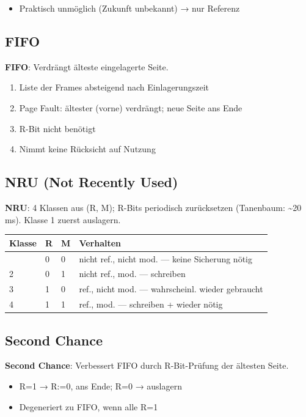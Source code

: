 \documentclass[11pt, a4paper]{article}
\begin{document}
\begin{itemize}
  \item Praktisch unmöglich (Zukunft unbekannt) → nur Referenz
\end{itemize}


\subsection{FIFO}
\textbf{FIFO}: Verdrängt älteste eingelagerte Seite.

\begin{enumerate}
  \item Liste der Frames absteigend nach Einlagerungszeit
  \item Page Fault: ältester (vorne) verdrängt; neue Seite ans Ende
  \item R-Bit nicht benötigt
  \item Nimmt keine Rücksicht auf Nutzung
\end{enumerate}


\subsection{NRU (Not Recently Used)}
\textbf{NRU}: 4 Klassen aus (R, M); R-Bits periodisch zurücksetzen (Tanenbaum: \textasciitilde{}20 ms). Klasse 1 zuerst auslagern.



{\small
\begin{tabularx}{\linewidth}{XXXX}
\hline
\rowcolor{tableheadbg}
{\color{white}\textbf{Klasse}} & {\color{white}\textbf{R}} & {\color{white}\textbf{M}} & {\color{white}\textbf{Verhalten}} \\[2pt]
\hline
\endhead
\hline
\endfoot
1 & 0 & 0 & nicht ref., nicht mod. — keine Sicherung nötig \\
2 & 0 & 1 & nicht ref., mod. — schreiben \\
3 & 1 & 0 & ref., nicht mod. — wahrscheinl. wieder gebraucht \\
4 & 1 & 1 & ref., mod. — schreiben + wieder nötig \\
\end{tabularx}
}



\subsection{Second Chance}
\textbf{Second Chance}: Verbessert FIFO durch R-Bit-Prüfung der ältesten Seite.

\begin{itemize}
  \item R=1 → R:=0, ans Ende; R=0 → auslagern
  \item Degeneriert zu FIFO, wenn alle R=1
\end{itemize}
\end{document}
